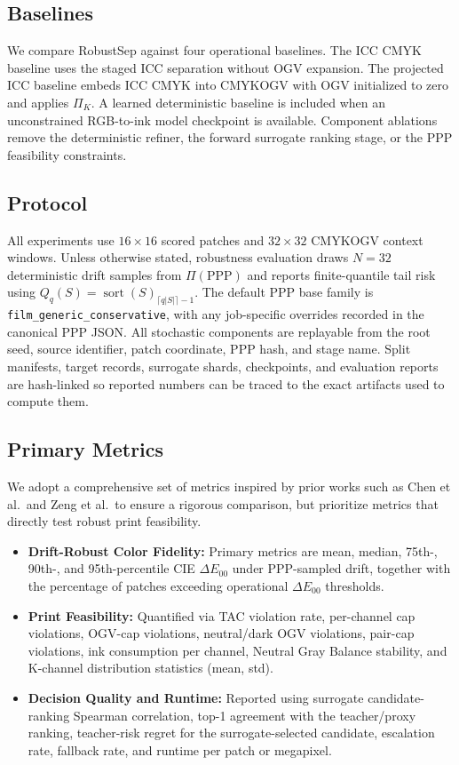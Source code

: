 \documentclass[acmsmall,screen,nonacm]{acmart}
\begin{document}
\subsection{Baselines}

We compare RobustSep against four operational baselines. The ICC CMYK baseline uses the staged ICC separation without OGV expansion. The projected ICC baseline embeds ICC CMYK into CMYKOGV with OGV initialized to zero and applies $\Pi_K$. A learned deterministic baseline is included when an unconstrained RGB-to-ink model checkpoint is available. Component ablations remove the deterministic refiner, the forward surrogate ranking stage, or the PPP feasibility constraints.

\subsection{Protocol}

All experiments use $16\times16$ scored patches and $32\times32$ CMYKOGV context windows. Unless otherwise stated, robustness evaluation draws $N=32$ deterministic drift samples from $\Pi(\mathrm{PPP})$ and reports finite-quantile tail risk using $Q_q(S)=\operatorname{sort}(S)_{\lceil q|S|\rceil-1}$. The default PPP base family is \texttt{film\_generic\_conservative}, with any job-specific overrides recorded in the canonical PPP JSON. All stochastic components are replayable from the root seed, source identifier, patch coordinate, PPP hash, and stage name. Split manifests, target records, surrogate shards, checkpoints, and evaluation reports are hash-linked so reported numbers can be traced to the exact artifacts used to compute them.

\subsection{Primary Metrics}

We adopt a comprehensive set of metrics inspired by prior works such as Chen et al.\ and Zeng et al.\ to ensure a rigorous comparison, but prioritize metrics that directly test robust print feasibility.

\begin{itemize}
    \item \textbf{Drift-Robust Color Fidelity:} Primary metrics are mean, median, 75th-, 90th-, and 95th-percentile CIE $\Delta E_{00}$ under PPP-sampled drift, together with the percentage of patches exceeding operational $\Delta E_{00}$ thresholds.
    \item \textbf{Print Feasibility:} Quantified via TAC violation rate, per-channel cap violations, OGV-cap violations, neutral/dark OGV violations, pair-cap violations, ink consumption per channel, Neutral Gray Balance stability, and K-channel distribution statistics (mean, std).
    \item \textbf{Decision Quality and Runtime:} Reported using surrogate candidate-ranking Spearman correlation, top-1 agreement with the teacher/proxy ranking, teacher-risk regret for the surrogate-selected candidate, escalation rate, fallback rate, and runtime per patch or megapixel.
\end{itemize}
\end{document}
